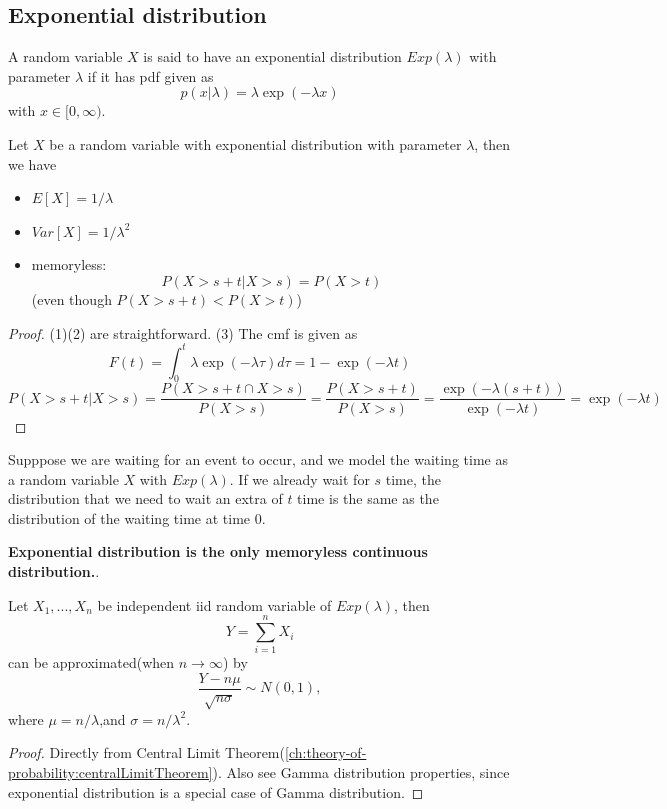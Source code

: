 \begin{refsection}
\subsection{Exponential distribution}
\begin{definition}
	A random variable $X$ is said to have an exponential distribution $Exp(\lambda)$ with parameter $\lambda$ if it has pdf given as
	$$p(x|\lambda) = \lambda \exp(-\lambda x)$$
	with $x\in [0,\infty)$.	
\end{definition}

\begin{lemma}
	Let $X$ be a random variable with exponential distribution with parameter $\lambda$, then we have
	\begin{itemize}
		\item $E[X] = 1/\lambda$
		\item $Var[X] = 1/\lambda^2$
		\item memoryless: 
		$$P(X > s+t | X > s) = P(X>t)$$
		(even though $P(X>s+t) < P(X>t)$)
	\end{itemize}
\end{lemma}
\begin{proof}
(1)(2) are straightforward. (3) The cmf is given as
$$F(t) = \int_0^t \lambda\exp(-\lambda \tau) d\tau = 1-\exp(-\lambda t)$$
$$P(X>s+t|X>s) = \frac{P(X>s+t \cap X > s)}{P(X>s)} = \frac{P(X > s+t)}{P(X>s)} = \frac{\exp(-\lambda(s+t))}{\exp(-\lambda t)} = \exp(-\lambda t)$$
\end{proof}


\begin{remark}
Supppose we are waiting for an event to occur, and we model the waiting time as a random variable $X$ with $Exp(\lambda)$. If we already wait for $s$ time, the distribution that we need to wait an extra of $t$ time is the same as the distribution of the waiting time at time 0.
\end{remark}

\begin{remark}
\textbf{Exponential distribution is the only memoryless continuous distribution.}\cite{brzezniak1999basic}.
\end{remark}

\begin{lemma}
	Let $X_1,...,X_n$ be independent iid random variable of $Exp(\lambda)$, then
	$$Y = \sum_{i=1}^n X_i$$
	can be approximated(when $n\to \infty$) by $$\frac{Y - n\mu}{\sqrt{n\sigma}}\sim N(0,1),$$
	where $\mu = n/\lambda$,and $\sigma = n/\lambda^2$.
\end{lemma}
\begin{proof}
	Directly from Central Limit Theorem(\autoref{ch:theory-of-probability:centralLimitTheorem}). Also see Gamma distribution properties, since exponential distribution is a special case of Gamma distribution.
\end{proof}



\end{refsection}
